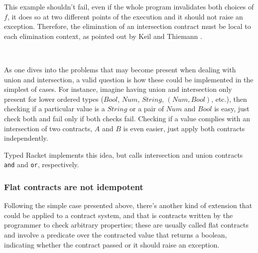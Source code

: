 This example shouldn't fail, even if the whole program invalidates both choices of $f$, it does
so at two different points of the execution and it should not raise an exception.
Therefore, the elimination of an intersection contract must be local to each elimination
context, as pointed out by Keil and Thiemann \cite{KeilThiemannUnionIntersection}.

\\


As one dives into the problems that may become present when dealing with union and intersection,
a valid question is how these could be implemented in the simplest of cases.
For instance, imagine having
union and intersection only present for lower ordered types 
($Bool$, $Num$, $String$, $(Num, Bool)$, etc.), then checking
if a particular value is a $String$ or a pair of $Num$ and $Bool$ is easy,
just check both and fail only if both checks fail.
Checking if a value complies with an intersection of two contracts, $A$ and $B$ is even
easier, just apply both contracts independently.

Typed Racket implements this idea, but calls intersection and union contracts
\texttt{and} and \texttt{or}, respectively.


\subsubsection*{Flat contracts are not idempotent}

Following the simple case presented above, there's another kind of extension that could be
applied to a contract system, and that is contracts written by the
programmer to check arbitrary properties; these are usually called flat contracts and
involve a predicate over the contracted value that returns a boolean, indicating whether
the contract passed or it should raise an exception.

